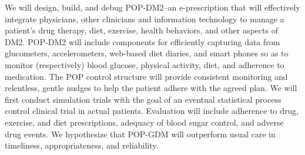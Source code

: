 \documentclass[11pt]{article}
\begin{document}
 We will design, build, and debug
POP-DM2--an e-prescription that will effectively integrate physicians,
other clinicians and information technology to manage a patient's drug
therapy, diet, exercise, health behaviors, and other aspects of
DM2. POP-DM2 will include components for efficiently capturing data
from glucometers, accelerometers, web-based diet diaries, and smart
phones so as to monitor (respectively) blood glucose, physical
activity, diet, and adherence to medication. The POP control structure
will provide consistent monitoring and relentless, gentle nudges to
help the patient adhere with the agreed plan. We will first conduct
simulation trials with the goal of an eventual statistical process
control clinical trial in actual patients. Evaluation will include
adherence to drug, exercise, and diet prescriptions, adequacy of blood
sugar control, and adverse drug events. We hypothesize that POP-GDM
will outperform usual care in timeliness, appropriateness, and
reliability.

\newpage



\end{document}
